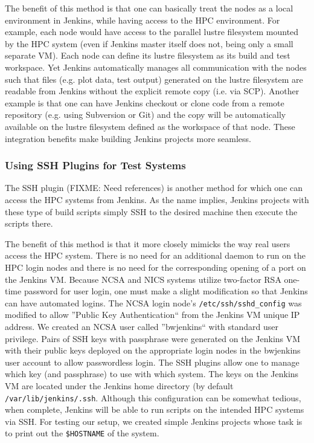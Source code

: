 \documentclass[10pt, conference, compsocconf]{IEEEtran}
\begin{document}
The benefit of this method is that one can basically treat the nodes as a local environment in Jenkins, while having access to the HPC environment. 
For example, each node would have access to the parallel lustre filesystem mounted by the HPC system (even if Jenkins master itself does not, being only a small separate VM). 
Each node can define its lustre filesystem as its build and test workspace. 
Yet Jenkins automatically manages all communication with the nodes such that files (e.g. plot data, test output) generated on the lustre filesystem are readable from Jenkins without the explicit remote copy (i.e. via SCP). 
Another example is that one can have Jenkins checkout or clone code from a remote repository (e.g. using Subversion or Git) and the copy will be automatically available on the lustre filesystem defined as the workspace of that node. 
These integration benefits make building Jenkins projects more seamless.

\subsubsection{Using SSH Plugins for Test Systems}
The SSH plugin (FIXME: Need references) is another method for which one can access the HPC systems from Jenkins. 
As the name implies, Jenkins projects with these type of build scripts simply SSH to the desired machine then execute the scripts there. 


The benefit of this method is that it more closely mimicks the way real users access the HPC system. 
There is no need for an additional daemon to run on the HPC login nodes and there is no need for the corresponding opening of a port on the Jenkins VM. 
Because NCSA and NICS systems utilize two-factor RSA one-time password for user login, one must make a slight modification so that Jenkins can have automated logins. 
The NCSA login node's \texttt{/etc/ssh/sshd_config} was modified to allow ''Public Key Authentication`` from the Jenkins VM unique IP address. 
We created an NCSA user called ''bwjenkins`` with standard user privilege. 
Pairs of SSH keys with passphrase were generated on the Jenkins VM with their public keys deployed on the appropriate login nodes in the bwjenkins user account to allow passwordless login. 
The SSH plugins allow one to manage which key (and passphrase) to use with which system. 
The keys on the Jenkins VM are located under the Jenkins home directory (by default \texttt{/var/lib/jenkins/.ssh}. 
Although this configuration can be somewhat tedious, when complete, Jenkins will be able to run scripts on the intended HPC systems via SSH. 
For testing our setup, we created simple Jenkins projects whose task is to print out the \texttt{\$HOSTNAME} of the system.
\end{document}
